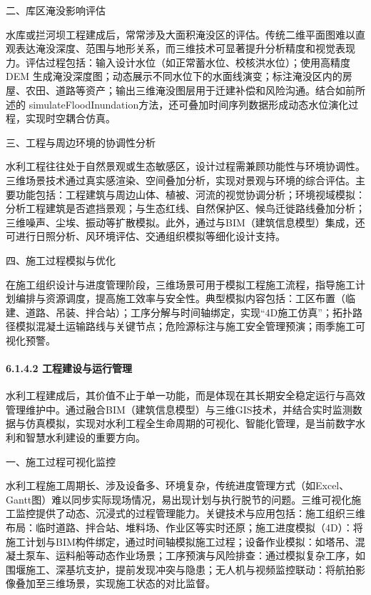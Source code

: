 二、库区淹没影响评估

水库或拦河坝工程建成后，常常涉及大面积淹没区的评估。传统二维平面图难以直观表达淹没深度、范围与地形关系，而三维技术可显著提升分析精度和视觉表现力。评估过程包括：输入设计水位（如正常蓄水位、校核洪水位）；使用高精度 DEM 生成淹没深度图；动态展示不同水位下的水面线演变；标注淹没区内的房屋、农田、道路等资产；输出三维淹没图层用于迁建补偿和风险沟通。结合如前所述的 simulateFloodInundation方法，还可叠加时间序列数据形成动态水位演化过程，实现时空耦合仿真。

三、工程与周边环境的协调性分析

水利工程往往处于自然景观或生态敏感区，设计过程需兼顾功能性与环境协调性。三维场景技术通过真实感渲染、空间叠加分析，实现对景观与环境的综合评估。主要功能包括：工程建筑与周边山体、植被、河流的视觉协调分析；环境视域模拟：分析工程建筑是否遮挡景观；与生态红线、自然保护区、候鸟迁徙路线叠加分析；三维噪声、尘埃、振动等扩散模拟。此外，通过与BIM（建筑信息模型）集成，还可进行日照分析、风环境评估、交通组织模拟等细化设计支持。

四、施工过程模拟与优化

在施工组织设计与进度管理阶段，三维场景可用于模拟工程施工流程，指导施工计划编排与资源调度，提高施工效率与安全性。典型模拟内容包括：工区布置（临建、道路、吊装、拌合站）；工序分解与时间轴绑定，实现``4D施工仿真''；拓扑路径模拟混凝土运输路线与关键节点；危险源标注与施工安全管理预演；雨季施工可视化预警。

\hypertarget{ux5de5ux7a0bux5efaux8bbeux4e0eux8fd0ux884cux7ba1ux7406}{%
\paragraph{6.1.4.2 工程建设与运行管理}\label{ux5de5ux7a0bux5efaux8bbeux4e0eux8fd0ux884cux7ba1ux7406}}

水利工程建成后，其价值不止于单一功能，而是体现在其长期安全稳定运行与高效管理维护中。通过融合BIM（建筑信息模型）与三维GIS技术，并结合实时监测数据与仿真模拟，实现对水利工程全生命周期的可视化、智能化管理，是当前数字水利和智慧水利建设的重要方向。

一、施工过程可视化监控

水利工程施工周期长、涉及设备多、环境复杂，传统进度管理方式（如Excel、Gantt图）难以同步实际现场情况，易出现计划与执行脱节的问题。三维可视化施工监控提供了动态、沉浸式的过程管理能力。关键技术与应用包括：施工组织三维布局：临时道路、拌合站、堆料场、作业区等实时还原；施工进度模拟（4D）：将施工计划与BIM构件绑定，通过时间轴模拟施工过程；设备作业模拟：如塔吊、混凝土泵车、运料船等动态作业场景；工序预演与风险排查：通过模拟复杂工序，如围堰施工、深基坑支护，提前发现冲突与隐患；无人机与视频监控联动：将航拍影像叠加至三维场景，实现施工状态的对比监督。


